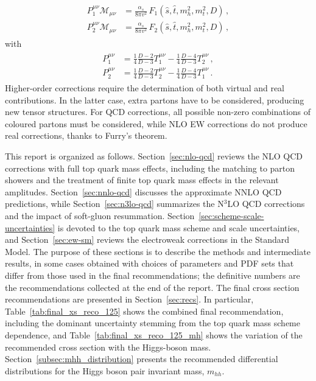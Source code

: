 \begin{align}
    \label{eq:in:ffe}
    \begin{aligned}
        P_1^{\mu\nu} \mathcal{M}_{\mu\nu}   &= \frac{\alpha_s}{8\pi v^2}\,F_1(\hat{s},\hat{t},m_h^2,m_t^2,D)
        \,, \\
        P_2^{\mu\nu} \mathcal{M}_{\mu\nu}   &= \frac{\alpha_s}{8\pi v^2}\,F_2(\hat{s},\hat{t},m_h^2,m_t^2,D)\,,
    \end{aligned}
\end{align}
with
\begin{align}
    \begin{aligned}
        P_1^{\mu\nu}    &=
        \frac{1}{4}\frac{D-2}{D-3} T_1^{\mu\nu} - \frac{1}{4}\frac{D-4}{D-3} T_2^{\mu\nu}
        \,,\\
        P_2^{\mu\nu}    &=
        \frac{1}{4}\frac{D-2}{D-3} T_2^{\mu\nu} - \frac{1}{4}\frac{D-4}{D-3} T_1^{\mu\nu}
        \,.
    \end{aligned}
\end{align}
Higher-order corrections require the determination of both virtual and real contributions. In the latter case, extra partons have to be considered, producing new tensor structures. For QCD corrections, all possible non-zero combinations of coloured partons must be considered, while NLO EW corrections do not produce real corrections, thanks to Furry's theorem.

This report is organized as follows. Section~\ref{sec:nlo-qcd} reviews the
NLO QCD corrections with full top quark mass effects, including the matching
to parton showers and the treatment of finite top quark mass effects in the relevant
amplitudes. Section~\ref{sec:nnlo-qcd} discusses the approximate NNLO QCD
predictions, while Section~\ref{sec:n3lo-qcd} summarizes the N$^3$LO QCD
corrections and the impact of soft-gluon resummation.
Section~\ref{sec:scheme-scale-uncertainties} is devoted to the top quark mass
scheme and scale uncertainties, and Section~\ref{sec:ew-sm} reviews the
electroweak corrections in the Standard Model. The purpose of these sections
is to describe the methods and intermediate results, in some cases obtained
with choices of parameters and PDF sets that differ from those used in the
final recommendations; the definitive numbers are the recommendations collected
at the end of the report. The final cross section recommendations are presented
in Section~\ref{sec:recs}. In particular, Table~\ref{tab:final_xs_reco_125}
shows the combined final recommendation, including the dominant uncertainty
stemming from the top quark mass scheme dependence, and
Table~\ref{tab:final_xs_reco_125_mh} shows the variation of the recommended
cross section with the Higgs-boson mass. Section~\ref{subsec:mhh_distribution}
presents the recommended differential distributions for the Higgs boson pair invariant mass, $m_{hh}$.
